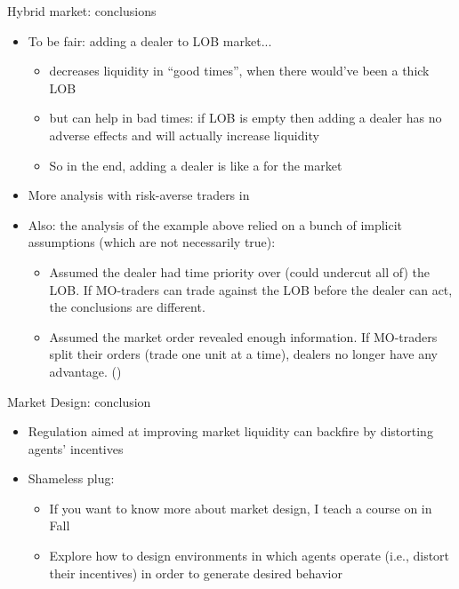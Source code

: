 \documentclass[english,10pt
,aspectratio=169
]{beamer}
\begin{document}
\begin{frame}{Hybrid market: conclusions}
	\begin{itemize}
		\item To be fair: adding a dealer to LOB market... 
		\begin{itemize}
			\item decreases liquidity in ``good times'', when there would've been a thick LOB
			\item but can help in bad times: if LOB is empty then adding a dealer has no adverse effects and will actually increase liquidity
			\item So in the end, adding a dealer is like a  for the market
		\end{itemize}
		\item More analysis with risk-averse traders in \cite{viswanathan_market_2002}
		\item Also: the analysis of the example above relied on a bunch of implicit assumptions (which are not necessarily true):
		\begin{itemize}
			\item Assumed the dealer had time priority over (could undercut all of) the LOB. If MO-traders can trade against the LOB before the dealer can act, the conclusions are different.
			\item Assumed the market order revealed enough information. If MO-traders split their orders (trade one unit at a time), dealers no longer have any advantage. (\cite{back_working_2007})
		\end{itemize}
	\end{itemize}
\end{frame}


\begin{frame}{Market Design: conclusion}
	\begin{itemize}
		\item Regulation aimed at improving market liquidity can backfire by distorting agents' incentives
		\item Shameless plug:
		\begin{itemize}
			\item If you want to know more about market design, I teach a course on  in Fall
			\item Explore how to design environments in which agents operate (i.e., distort their incentives) in order to generate desired behavior
		\end{itemize}
	\end{itemize}
\end{frame}
\end{document}
